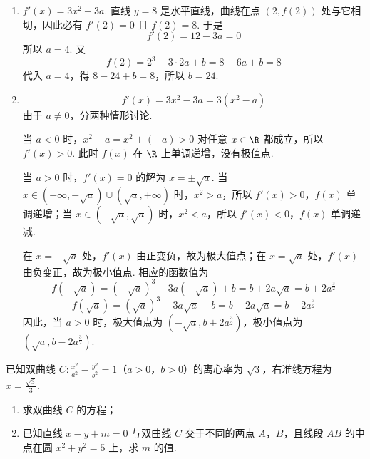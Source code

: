 \begin{solution}
\begin{enumerate}
\item \(f'(x)=3x^2-3a\).
直线 \(y=8\) 是水平直线，曲线在点 \((2,f(2))\) 处与它相切，因此必有 \(f'(2)=0\) 且 \(f(2)=8\).
于是
\[
f'(2)=12-3a=0
\]
所以 \(a=4\).
又
\[
f(2)=2^3-3\cdot2a+b=8-6a+b=8
\]
代入 \(a=4\)，得 \(8-24+b=8\)，所以 \(b=24\).

\item
\[
f'(x)=3x^2-3a=3\left(x^2-a\right)
\]
由于 \(a\neq0\)，分两种情形讨论.

当 \(a<0\) 时，\(x^2-a=x^2+(-a)>0\) 对任意 \(x\in\R\) 都成立，所以 \(f'(x)>0\).
此时 \(f(x)\) 在 \(\R\) 上单调递增，没有极值点.

当 \(a>0\) 时，\(f'(x)=0\) 的解为 \(x=\pm\sqrt a\).
当 \(x\in(-\infty,-\sqrt a)\cup(\sqrt a,+\infty)\) 时，\(x^2>a\)，所以 \(f'(x)>0\)，\(f(x)\) 单调递增；当 \(x\in(-\sqrt a,\sqrt a)\) 时，\(x^2<a\)，所以 \(f'(x)<0\)，\(f(x)\) 单调递减.

在 \(x=-\sqrt a\) 处，\(f'(x)\) 由正变负，故为极大值点；在 \(x=\sqrt a\) 处，\(f'(x)\) 由负变正，故为极小值点.
相应的函数值为
\[
f(-\sqrt a)=(-\sqrt a)^3-3a(-\sqrt a)+b=b+2a\sqrt a=b+2a^{\frac{3}{2}}
\]
\[
f(\sqrt a)=(\sqrt a)^3-3a\sqrt a+b=b-2a\sqrt a=b-2a^{\frac{3}{2}}
\]
因此，当 \(a>0\) 时，极大值点为 \(\left(-\sqrt a,b+2a^{\frac{3}{2}}\right)\)，极小值点为 \(\left(\sqrt a,b-2a^{\frac{3}{2}}\right)\).
\end{enumerate}
\end{solution}

\begin{problem}
已知双曲线 \(C: \frac{x^2}{a^2} - \frac{y^2}{b^2} = 1\)（\(a > 0\)，\(b > 0\)）的离心率为 \(\sqrt{3}\)，右准线方程为 \(x = \frac{\sqrt{3}}{3}\).
\begin{enumerate}
\item 求双曲线 \(C\) 的方程；
\item 已知直线 \(x - y + m = 0\) 与双曲线 \(C\) 交于不同的两点 \(A\)，\(B\)，且线段 \(AB\) 的中点在圆 \(x^{2} + y^{2} = 5\) 上，求 \(m\) 的值.
\end{enumerate}

\end{problem}

